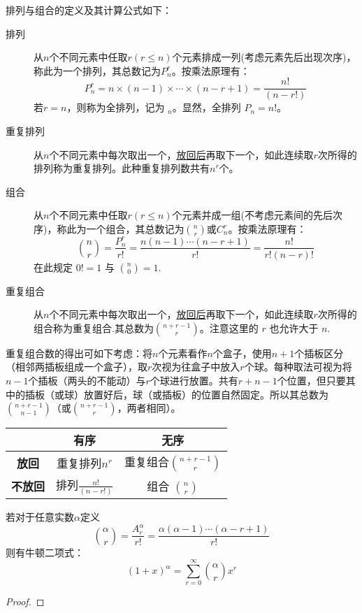 排列与组合的定义及其计算公式如下：
\begin{description}
  \item[排列] 从$n$个不同元素中任取$r (r \le n)$个元素排成一列(考虑元素先后出现次序)，称此为一个排列，其总数记为$P_n^r$。按乘法原理有：
    \[ P_n^r = n \times (n - 1) \times \dotsb \times (n - r + 1) = \frac{n!}{(n - r!)} \]
    若$r = n$，则称为全排列，记为 $_n$。显然，全排列 $P_n = n!$。
  \item[重复排列] 从$n$个不同元素中每次取出一个，\underline{放回后}再取下一个，如此连续取$r$次所得的排列称为重复排列。此种重复排列数共有$n^r$个。
  \item[组合] 从$n$个不同元素中任取$r (r \le n)$个元素并成一组(不考虑元素间的先后次序)，称此为一个组合，其总数记为$\binom{n}{r}$或$C_n^r$。按乘法原理有：
    \[ \binom{n}{r} = \frac{P_n^r}{r!} = \frac{n (n - 1) \dotsb (n - r + 1)}{r!} = \frac{n!}{r! (n - r)!} \]
    在此规定 $0! = 1$ 与 $\binom{n}{0} = 1$.
  \item[重复组合] 从$n$个不同元素中每次取出一个，\underline{放回后}再取下一个，如此连续取$r$次所得的组合称为重复组合.其总数为$\binom{n + r - 1}{r}$。注意这里的 $r$ 也允许大于 $n$.
\end{description}

重复组合数的得出可如下考虑：将$n$个元素看作$n$个盒子，使用$n+1$个插板区分（相邻两插板组成一个盒子），取$r$次视为往盒子中放入$r$个球。每种取法可视为将$n-1$个插板（两头的不能动）与$r$个球进行放置。共有$r+n-1$个位置，但只要其中的插板（或球）放置好后，球（或插板）的位置自然固定。所以其总数为$\binom{n + r - 1}{n-1}$（或$\binom{n + r - 1}{r}$，两者相同）。

\begin{table}[h]
  \centering
  \begin{tabular}{|c|c|c|}
    \hline
                     & \bfseries 有序            & \bfseries 无序                 \\ \hline
    \bfseries 放回   & 重复排列$n^r$             & 重复组合$\binom{n + r - 1}{r}$ \\ \hline
    \bfseries 不放回 & 排列$\frac{n!}{(n - r!)}$ & 组合 $\binom{n}{r}$            \\ \hline
  \end{tabular}
\end{table}

\begin{theorem}[牛顿二项式定理]\label{No}
  若对于任意实数$\alpha$定义
  \[ \binom{\alpha}{r}=\frac{A^{\alpha}_{r}}{r!}=\frac{\alpha(\alpha-1)\cdots (\alpha-r+1)}{r!} \]
  则有牛顿二项式：
  \[ (1+x)^{\alpha}=\sum_{r=0}^{\infty}\binom{\alpha}{r}x^r \]
\end{theorem}

\begin{proof}
\end{proof}